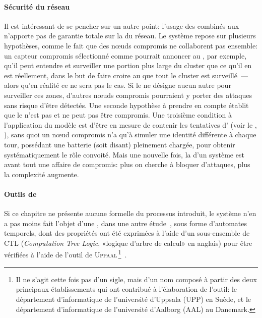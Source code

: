 \paragraph{Sécurité du réseau}
Il est intéressant de se pencher sur un autre point: l'usage des \cns combinés aux \vns n'apporte pas de garantie totale sur la \secu du réseau.
Le système repose sur plusieurs hypothèses, comme le fait que des nœuds compromis ne collaborent pas ensemble: un capteur compromis sélectionné comme \cn pourrait annoncer au \ch, par exemple, qu'il peut entendre et surveiller une portion plus large du cluster que ce qu'il en est réellement, dans le but de faire croire au \CH que tout le cluster est surveillé~--- alors qu'en réalité ce ne sera pas le cas.
Si le \CH ne désigne aucun autre \cn pour surveiller ces zones, d'autres nœuds compromis pourraient y porter des attaques sans risque d'être détectés.
Une seconde hypothèse à prendre en compte établit que le \ch n'est pas et ne peut pas être compromis.
Une troisième condition à l'application du modèle est d'être en mesure de contenir les tentatives d' (voir le , ), sans quoi un nœud compromis n'a qu'à simuler une identité différente à chaque tour, possédant une batterie (soit disant) pleinement chargée, pour obtenir systématiquement le rôle convoité.
Mais une nouvelle fois, la \secu d'un système est avant tout une affaire de compromis: plus on cherche à bloquer d'attaques, plus la complexité augmente.

\paragraph{Outils de }
Si ce chapitre ne présente aucune  formelle du processus introduit, le système n'en a pas moins fait l'objet d'une , dans une autre étude~\cite{HMMBA14}, sous forme d'automates temporels, dont des propriétés ont été exprimées à l'aide d'un sous-ensemble de CTL (\textit{Computation Tree Logic}, «logique d'arbre de calcul» en anglais) pour être vérifiées à l'aide de l'outil de \modelchecking \textsc{Uppaal}\,\footnote{Il ne s'agit cette fois pas d'un sigle, mais d'un nom composé à partir des deux principaux établissements qui ont contribué à l'élaboration de l'outil: le département d'informatique de l'université d'Uppsala (UPP) en Suède, et le département d'informatique de l'université d'Aalborg (AAL) au Danemark.}~\cite{BDL04, uppaal}.
